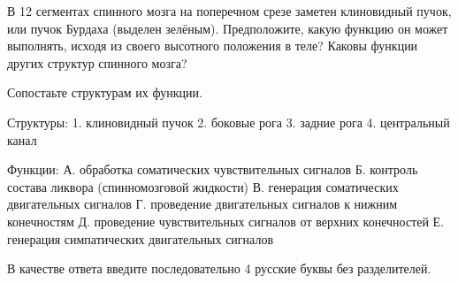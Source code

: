 
В 12 сегментах спинного мозга на поперечном срезе заметен клиновидный пучок, или пучок Бурдаха (выделен зелёным). Предположите, какую функцию он может выполнять, исходя из своего высотного положения в теле? Каковы функции других структур спинного мозга?


Сопостаьте структурам их функции.

Структуры:
1. клиновидный пучок
2. боковые рога
3. задние рога
4. центральный канал

Функции:
А. обработка соматических чувствительных сигналов
Б. контроль состава ликвора (спинномозговой жидкости)
В. генерация соматических двигательных сигналов
Г. проведение двигательных сигналов к нижним конечностям
Д. проведение чувствительных сигналов от верхних конечностей
Е. генерация симпатических двигательных сигналов

В качестве ответа введите последовательно 4 русские буквы без разделителей.